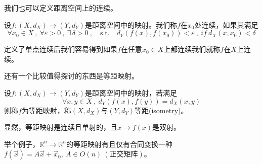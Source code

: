 我们也可以定义距离空间上的连续。
\begin{definition}
设$f:(X,d_X) \rightarrow (Y,d_Y)$是距离空间中的映射。我们称$f$在$x_0$处连续，如果其满足
\[\forall x_0 \in X \ , \ \forall \varepsilon>0 \ , \ \exists \, \delta>0 \ , \quad \text{s.t.} \quad d_Y(f(x),f(x_0))<\varepsilon \ , \ if \ d_X(x,x_0)<\delta\]
\end{definition}
定义了单点连续后我们容易得到如果$f$在任意$x_0 \in X$上都连续我们就称$f$在$X$上连续。

还有一个比较值得探讨的东西是等距映射。
\begin{definition}[等距映射]
设$f:(X,d_X) \rightarrow (Y,d_Y)$是距离空间中的映射，若满足
\[\forall x,y \in X \ , \ d_Y(f(x),f(y))=d_X(x,y)\]
则称$f$为等距映射，称$(X,d_X)$与$(Y,d_Y)$等距(isometry)。
\end{definition}
显然，等距映射是连续且单射的，且$x \rightarrow f(x)$是双射。

举个例子，$\mathbb{R}^n \rightarrow \mathbb{R}^n$的等距映射有且仅有合同变换一种$f(\overrightarrow{x})=A\overrightarrow{x}+\overrightarrow{x}_0, \ A \in O(n) \ (\text{正交矩阵})$。

